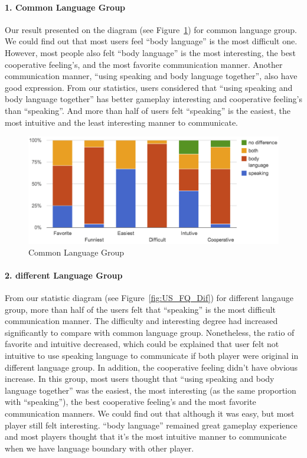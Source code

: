 \paragraph{1. Common Language Group}
Our result presented on the diagram (see Figure~\ref{fig:US_FQ_Com}) for common language group. We could find out that most users feel ``body language'' is the most difficult one. However, most people also felt ``body language'' is the most interesting, the best cooperative feeling's, and the most favorite communication manner. Another communication manner, ``using speaking and body language together'', also have good expression. From our statistics, users considered that ``using speaking and body language together'' has better gameplay interesting and cooperative feeling's than ``speaking''. And more than half of users felt ``speaking'' is the easiest, the most intuitive and the least interesting manner to communicate.

\begin{figure}[!h]
\centering
\includegraphics[width=0.9\columnwidth]{Figures/US_FQ_Com.png}
\caption{Common Language Group}
\label{fig:US_FQ_Com}
\end{figure}

\paragraph{2. different Language Group}
From our statistic diagram (see Figure~\ref{fig:US_FQ_Dif}) for different langauge group, more than half of the users felt that ``speaking'' is the most difficult communication manner. The difficulty and interesting degree had increased significantly to compare with common language group. Nonetheless, the ratio of favorite and intuitive decreased, which could be explained that user felt not intuitive to use speaking language to communicate if both player were original in different language group. In addition, the cooperative feeling didn't have obvious increase. In this group, most users thought that ``using speaking and body language together'' was the easiest, the most interesting (as the same proportion with ``speaking''), the best cooperative feeling's and the most favorite communication manners. We could find out that although it was easy, but most player still felt interesting. ``body language'' remained great gameplay experience and most players thought that it's the most intuitive manner to communicate when we have language boundary with other player.


